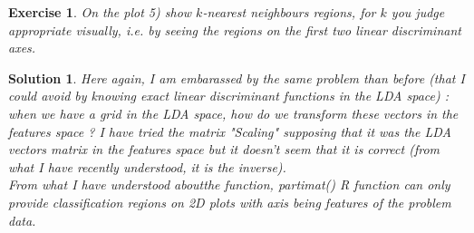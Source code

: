 \documentclass[12pt,a4paper]{article}
\newtheorem{exercise}{Exercise}
\newtheorem{solution}{Solution}
\begin{document}
\begin{exercise}
On the plot 5) show $k$-nearest neighbours regions, for $k$ you judge appropriate visually, i.e. 
 by seeing the regions on the first two linear discriminant axes.
\end{exercise}
\begin{solution}
Here again, I am embarassed by the same problem than before (that I could avoid by knowing exact linear discriminant functions in the LDA space) : when we have a grid in the LDA space, how do we transform these vectors in the features space ? I have tried the matrix "Scaling" supposing that it was the LDA vectors matrix in the features space but it doesn't seem that it is correct (from what I have recently understood, it is the inverse).\\

From what I have understood aboutthe function, partimat() R function can only provide classification regions on 2D plots with axis being features of the problem data.
\end{solution}
\end{document}
